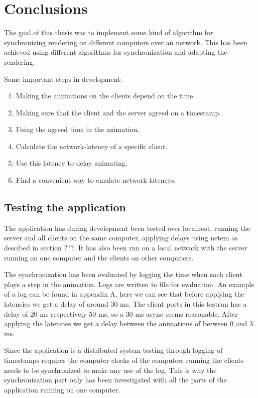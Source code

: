 \chapter{Conclusions}
The goal of this thesis was to implement some kind of algorithm for synchronizing rendering on different computers over an network. This has been achieved using different algorithms for synchronization and adapting the rendering.

Some important steps in development:
\begin{enumerate}
  \item Making the animations on the clients depend on the time. 
  \item Making sure that the client and the server agreed on a timestamp.
  \item Using the agreed time in the animation.
  \item Calculate the network-latency of a specific client.
  \item Use this latency to delay animating. 
  \item Find a convenient way to emulate network latencys.
\end{enumerate}

\section {Testing the application}
The application has during development been tested over localhost, running the server and all clients on the same computer, applying delays using netem as descibed in section ???. It has also been run on a local network with the server running on one computer and the clients on other computers. 

The synchronization has been evaluated by logging the time when each client plays a step in the animation. Logs are written to file for evaluation. An example of a log can be found in appendix A, here we can see that before applying the latencies we get a delay of around 30 ms. The client ports in this testrun has a delay of 20 ms respectively 50 ms, so a 30 ms async seems reasonable. After applying the latencies we get a delay between the animations of between 0 and 3 ms. 

Since the application is a distributed system testing through logging of timestamps requires the computer clocks of the computers running the clients needs to be synchronized to make any use of the log. This is why the synchronization part only has been investigated with all the parts of the application running on one computer. 

